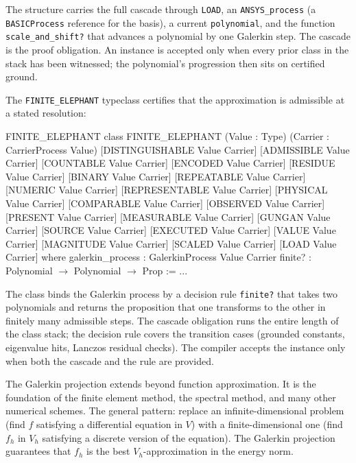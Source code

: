 The structure carries the full cascade through \texttt{LOAD}, an
\texttt{ANSYS\_process} (a \texttt{BASICProcess} reference for the
basis), a current \texttt{polynomial}, and the function
\texttt{scale\_and\_shift?} that advances a polynomial by one
Galerkin step. The cascade is the proof obligation. An instance is
accepted only when every prior class in the stack has been
witnessed; the polynomial's progression then sits on certified
ground.

The \texttt{FINITE\_ELEPHANT} typeclass certifies that the
approximation is admissible at a stated resolution:

\begin{leanexcerpt}{FINITE_ELEPHANT}
class FINITE_ELEPHANT
    (Value : Type)
    (Carrier : CarrierProcess Value)
    [DISTINGUISHABLE Value Carrier] [ADMISSIBLE Value Carrier]
    [COUNTABLE Value Carrier]       [ENCODED Value Carrier]
    [RESIDUE Value Carrier]         [BINARY Value Carrier]
    [REPEATABLE Value Carrier]      [NUMERIC Value Carrier]
    [REPRESENTABLE Value Carrier]   [PHYSICAL Value Carrier]
    [COMPARABLE Value Carrier]      [OBSERVED Value Carrier]
    [PRESENT Value Carrier]         [MEASURABLE Value Carrier]
    [GUNGAN Value Carrier]          [SOURCE Value Carrier]
    [EXECUTED Value Carrier]        [VALUE Value Carrier]
    [MAGNITUDE Value Carrier]       [SCALED Value Carrier]
    [LOAD Value Carrier]
  where
  galerkin_process : GalerkinProcess Value Carrier
  finite?          : Polynomial $\to$ Polynomial $\to$ Prop := ...
\end{leanexcerpt}

The class binds the Galerkin process by a decision rule
\texttt{finite?} that takes two polynomials and returns the
proposition that one transforms to the other in finitely many
admissible steps. The cascade obligation runs the entire length of
the class stack; the decision rule covers the transition cases
(grounded constants, eigenvalue hits, Lanczos residual checks). The
compiler accepts the instance only when both the cascade and the
rule are provided.

The Galerkin projection extends beyond function approximation. It is
the foundation of the finite element method, the spectral method,
and many other numerical schemes. The general pattern: replace an
infinite-dimensional problem (find $f$ satisfying a differential
equation in $V$) with a finite-dimensional one (find $f_h$ in $V_h$
satisfying a discrete version of the equation). The Galerkin
projection guarantees that $f_h$ is the best $V_h$-approximation in
the energy norm.

